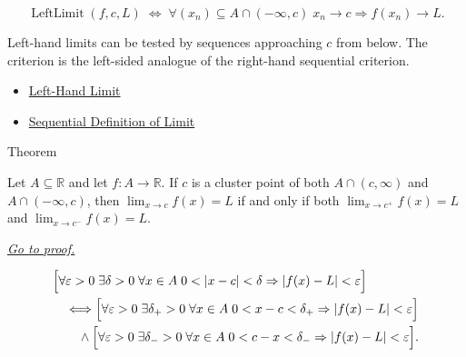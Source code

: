 \begin{remark*}
\[
  \operatorname{LeftLimit}(f,c,L)
  \;\Longleftrightarrow\;
  \forall (x_n)\subseteq A\cap(-\infty,c)\;
  x_n\to c\Rightarrow f(x_n)\to L.
\]
\end{remark*}

\begin{remark*}[Interpretation]
Left-hand limits can be tested by sequences approaching $c$ from below.
The criterion is the left-sided analogue of the right-hand sequential
criterion.
\end{remark*}

\begin{dependencies}
\begin{itemize}
  \item \hyperref[def:left-hand-limit]{Left-Hand Limit}
  \item \hyperref[def:limit-function-sequential]{Sequential Definition of Limit}
\end{itemize}
\end{dependencies}


\begin{theorembox}{Theorem}
\begin{theorem}
\label{thm:two-sided-limit-iff-matching-one-sided-limits}
Let $A\subseteq\mathbb{R}$ and let $f:A\to\mathbb{R}$. If $c$ is a
cluster point of both $A\cap(c,\infty)$ and $A\cap(-\infty,c)$, then
$\lim_{x\to c}f(x)=L$ if and only if both $\lim_{x\to c^+}f(x)=L$ and
$\lim_{x\to c^-}f(x)=L$.

\smallskip\noindent
\hyperref[prf:two-sided-limit-iff-matching-one-sided-limits]{\textit{Go to proof.}}
\end{theorem}
\end{theorembox}

\begin{remark*}
\[
\begin{aligned}
&\Bigl[\forall\varepsilon>0\;\exists\delta>0\;\forall x\in A\;
  0<|x-c|<\delta\Rightarrow |f(x)-L|<\varepsilon\Bigr] \\
&\quad\Longleftrightarrow
\Bigl[\forall\varepsilon>0\;\exists\delta_+>0\;\forall x\in A\;
  0<x-c<\delta_+\Rightarrow |f(x)-L|<\varepsilon\Bigr] \\
&\qquad\wedge
\Bigl[\forall\varepsilon>0\;\exists\delta_->0\;\forall x\in A\;
  0<c-x<\delta_-\Rightarrow |f(x)-L|<\varepsilon\Bigr].
\end{aligned}
\]
\end{remark*}

